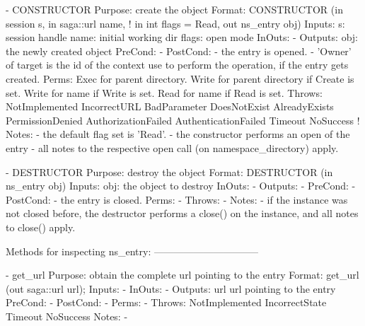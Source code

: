  
 \begin{myspec}
    - CONSTRUCTOR
      Purpose:  create the object
      Format:   CONSTRUCTOR          (in  session   s, 
                                      in  saga::url name,
!                                     in  int       flags = Read,
                                      out ns_entry obj)
      Inputs:   s:                    session handle
                name:                 initial working dir
                flags:                open mode
      InOuts:   -
      Outputs:  obj:                  the newly created object
      PreCond:  -
      PostCond: - the entry is opened.
                - 'Owner' of target is the id of the context
                  use to perform the operation, if the entry 
                  gets created.
      Perms:    Exec  for parent directory.
                Write for parent directory if Create is set.
                Write for name if Write is set.
                Read  for name if Read  is set.
      Throws:   NotImplemented
                IncorrectURL
                BadParameter
                DoesNotExist
                AlreadyExists
                PermissionDenied
                AuthorizationFailed
                AuthenticationFailed
                Timeout
                NoSuccess
!     Notes:    - the default flag set is 'Read'.
                - the constructor performs an open of the 
                  entry - all notes to the respective open 
                  call (on namespace_directory) apply.
 
 
    - DESTRUCTOR
      Purpose:  destroy the object
      Format:   DESTRUCTOR           (in  ns_entry     obj)
      Inputs:   obj:                  the object to destroy
      InOuts:   -
      Outputs:  -
      PreCond:  -
      PostCond: - the entry is closed.
      Perms:    -
      Throws:   - 
      Notes:    - if the instance was not closed before, the 
                  destructor performs a close() on the instance,
                  and all notes to close() apply.
 
 
 
    Methods for inspecting ns_entry:
    --------------------------------
 
    - get_url
      Purpose:  obtain the complete url pointing to the entry
      Format:   get_url            (out  saga::url url);
      Inputs:   -
      InOuts:   -
      Outputs:  url                 url pointing to the entry
      PreCond:  -
      PostCond: -
      Perms:    -
      Throws:   NotImplemented
                IncorrectState
                Timeout
                NoSuccess
      Notes:    -
 

\end{myspec}
